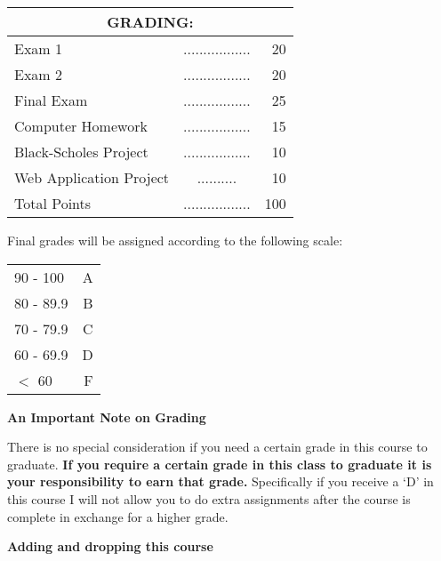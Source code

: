 \documentclass{article}
\begin{document}
\begin{center}
\begin{tabular}{lcr}
\multicolumn{3}{c}{\bf GRADING:} \\ \hline
Exam 1 & ................. & 20 \\

Exam 2 & ................. & 20 \\

Final Exam & ................. & 25\\


Computer Homework & ................. & 15 \\

Black-Scholes Project & ................. &  10 \\

Web Application Project & ..........& 10 \\

Total Points & ................. & 100\\
\end{tabular}
\end{center}
\vspace*{5pt}
\begin{center}
{Final grades will be assigned according to the following scale}:
\end{center}
\begin{center}
\begin{tabular}{lr}
90 - 100 &  A \\
80 - 89.9 &  B \\
70 - 79.9 &  C \\
60 - 69.9 &  D \\
$<$ 60 &  F \\
\end{tabular}
\end{center}
\vspace*{5pt}
\begin{center}
{\bf An Important Note on Grading}
\end{center}
There is no special consideration if you need a certain grade in this course to graduate.  {\bf If you require a certain grade in this class to graduate it is your responsibility to earn that grade.} Specifically if you receive a `D' in this course I will not allow you to do extra assignments after the course is complete in exchange for a higher grade. 
\begin{center}
{\bf Adding and dropping this course}
\end{center}
\end{document}
